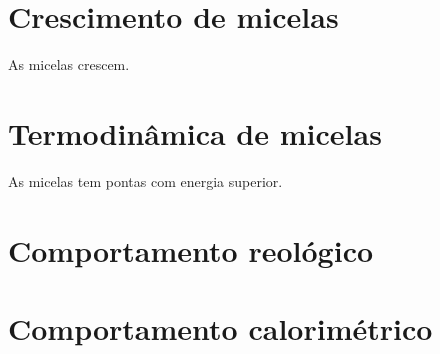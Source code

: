 		\section{Crescimento de micelas}
		As micelas crescem.
		\section{Termodinâmica de micelas}
		As micelas tem pontas com energia superior.
		\section{Comportamento reológico}
		\section{Comportamento calorimétrico}
		
